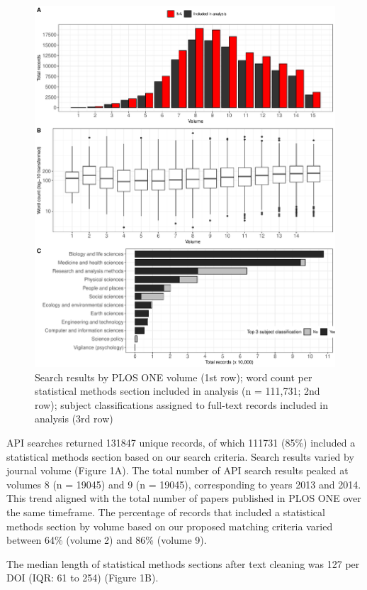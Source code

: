 \documentclass[
]{article}
\begin{document}
\begin{figure}
\centering
\includegraphics{draft_manuscript_files/figure-latex/unnamed-chunk-3-1.pdf}
\caption{\label{fig:plos-n}Search results by PLOS ONE volume (1st row);
word count per statistical methods section included in analysis (n =
111,731; 2nd row); subject classifications assigned to full-text records
included in analysis (3rd row)}
\end{figure}

API searches returned 131847 unique records, of which 111731 (85\%)
included a statistical methods section based on our search criteria.
Search results varied by journal volume (Figure 1A). The total number of
API search results peaked at volumes 8 (n = 19045) and 9 (n = 19045),
corresponding to years 2013 and 2014. This trend aligned with the total
number of papers published in PLOS ONE over the same timeframe. The
percentage of records that included a statistical methods section by
volume based on our proposed matching criteria varied between 64\%
(volume 2) and 86\% (volume 9).

The median length of statistical methods sections after text cleaning
was 127 per DOI (IQR: 61 to 254) (Figure 1B).
\end{document}
